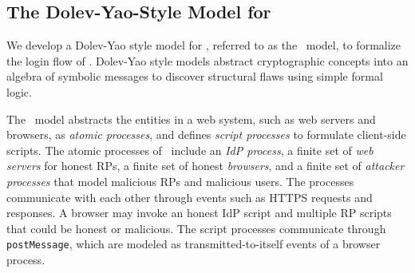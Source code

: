 

\subsection{The Dolev-Yao-Style Model for \usso}
\label{dy-model}

We develop a Dolev-Yao style model \cite{BrowserID, SPRESSO, FettKS16, FettKS17} for \usso, referred to as the \dyu~model, to formalize the login flow of \usso. Dolev-Yao style models abstract cryptographic concepts into an algebra of symbolic messages to discover structural flaws using simple formal logic. %

The \dyu~model abstracts the entities in a web system, such as web servers and browsers, as \emph{atomic processes}, %
and defines \emph{script processes} to formulate client-side scripts.
The atomic processes of \usso~include an {\em IdP process}, a finite set of {\em web servers} for honest RPs, a finite set of honest {\em browsers}, and a finite set of {\em attacker processes} that model malicious RPs and malicious users.
The processes communicate with each other through events such as HTTPS requests and responses. A browser may invoke an honest IdP script and multiple RP scripts that could be honest or malicious.
The script processes communicate through \verb+postMessage+, which are modeled as transmitted-to-itself events of a browser process.

